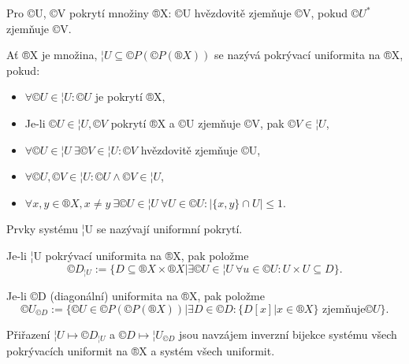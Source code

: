 \documentclass[12pt]{article}                   %
\begin{document}
    \begin{poznamka}
        Pro ©U, ©V pokrytí množiny ®X: ©U hvězdovitě zjemňuje ©V, pokud $©U^*$ zjemňuje ©V.
    \end{poznamka}

    \begin{definice}
        Ať ®X je množina, $¦U \subseteq ©P(©P(®X))$ se nazývá pokrývací uniformita na ®X, pokud:

        \begin{itemize}
            \item $\forall ©U \in ¦U: ©U$ je pokrytí ®X,
            \item Je-li $©U \in ¦U, ©V$ pokrytí ®X a ©U zjemňuje ©V, pak $©V \in ¦U$,
            \item $\forall ©U \in ¦U\ \exists ©V \in ¦U: ©V$ hvězdovitě zjemňuje ©U,
            \item $\forall ©U, ©V \in ¦U: ©U \wedge ©V \in ¦U$,
            \item $\forall x, y \in ®X, x ≠ y\ \exists ©U \in ¦U\ \forall U \in ©U: |\{x, y\} \cap U| ≤ 1$.
        \end{itemize}

        Prvky systému ¦U se nazývají uniformní pokrytí.
        
        Je-li ¦U pokrývací uniformita na ®X, pak položme
        $$ ©D_{¦U} := \{D \subseteq ®X \times ®X | \exists ©U \in ¦U\ \forall u \in ©U: U \times U \subseteq D\}. $$

        Je-li ©D (diagonální) uniformita na ®X, pak položme
        $$ ©U_{©D} := \{©U \in ©P(©P(®X)) | \exists D \in ©D: \{D[x] | x \in ®X\} \text{ zjemňuje} ©U\}. $$

        Přiřazení $¦U \mapsto ©D_{¦U}$ a $©D \mapsto ¦U_{©D}$ jsou navzájem inverzní bijekce systému všech pokrývacích uniformit na ®X a systém všech uniformit.
    \end{definice}
\end{document}
